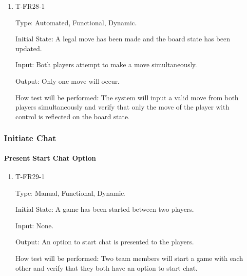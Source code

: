 \documentclass[12pt, titlepage]{article}
\begin{document}
        \begin{enumerate}

        \item{T-FR28-1\\}

            Type: Automated, Functional, Dynamic.
            					
            Initial State: A legal move has been made and the board state has been updated.
            					
            Input: Both players attempt to make a move simultaneously.
            					
            Output: Only one move will occur.

            How test will be performed: The system will input a valid move from both players simultaneously and verify that only the move of the player with control is reflected on the board state.

        \end{enumerate}

\subsubsection{Initiate Chat}
		
    \paragraph{Present Start Chat Option}
    
        \begin{enumerate}
        
            \item{T-FR29-1\\}
            
                Type: Manual, Functional, Dynamic.
                					
                Initial State: A game has been started between two players.
                					
                Input: None.
                					
                Output: An option to start chat is presented to the players.
                					
                How test will be performed: Two team members will start a game with each other and verify that they both have an option to start chat.
        
        \end{enumerate}
    
\end{document}
